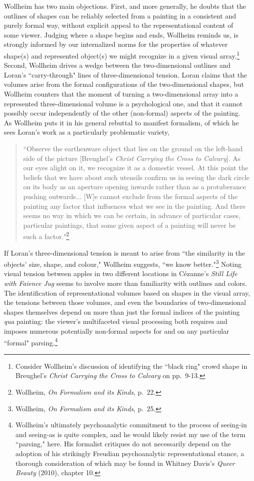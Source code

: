 Wollheim has two main objections.  First, and more generally, he doubts that the outlines of shapes can be reliably selected from a painting in a consistent and purely formal way, without explicit appeal to the representational content of some viewer.  Judging where a shape begins and ends, Wollheim reminds us, is strongly informed by our internalized norms for the properties of whatever shape(s) and represented object(s) we might recognize in a given visual array.\footnote{Consider Wollheim's discussion of identifying the ``black ring" crowd shape in Breughel's \emph{Christ Carrying the Cross to Calvary} on pp.\ 9-13.}  Second, Wollheim drives a wedge between the two-dimensional outlines and Loran's ``carry-through" lines of three-dimensional tension.  Loran claims that the volumes arise from the formal configurations of the two-dimensional shapes, but Wollheim counters that the moment of turning a two-dimensional array into a represented three-dimensional volume is a psychological one, and that it cannot possibly occur independently of the other (non-formal) aspects of the painting.  As Wollheim puts it in his general rebuttal to manifest formalism, of which he sees Loran's work as a particularly problematic variety,
\begin{quote}
``Observe the earthenware object that lies on the ground on the left-hand side of the picture [Breughel's \emph{Christ Carrying the Cross to Calvary}].  As our eyes alight on it, we recognize it as a domestic vessel.  At this point the beliefs that we have about such utensils confirm us in seeing the dark circle on its body as an aperture opening inwards rather than as a protuberance pushing outwards... [W]e cannot exclude from the formal aspects of the painting any factor that influences what we see in the painting.  And there seems no way in which we can be certain, in advance of particular cases, particular paintings, that some given aspect of a painting will never be such a factor."\footnote{Wollheim, \emph{On Formalism and its Kinds}, p.\ 22.}
\end{quote}
If Loran's three-dimensional tension is meant to arise from ``the similarity in the objects' size, shape, and colour," Wollheim suggests, ``we know better."\footnote{Wollheim, \emph{On Formalism and its Kinds}, p.\ 25.}  Noting visual tension between apples in two different locations in C\'{e}zanne's \emph{Still Life with Faience Jug} seems to involve more than familiarity with outlines and colors.  The identification of representational volumes based on shapes in the visual array, the tensions between those volumes, and even the boundaries of two-dimensional shapes themselves depend on more than just the formal indices of the painting \emph{qua} painting: the viewer's multifaceted visual processing both requires and imposes numerous potentially non-formal aspects for and on any particular ``formal" parsing.\footnote{Wollheim's ultimately psychoanalytic commitment to the process of seeing-in and seeing-as is quite complex, and he would likely resist my use of the term ``parsing," here.  His formalist critiques do not necessarily depend on the adoption of his strikingly Freudian psychoanalytic representational stance, a thorough consideration of which may be found in Whitney Davis's \emph{Queer Beauty} (2010), chapter 10.}

